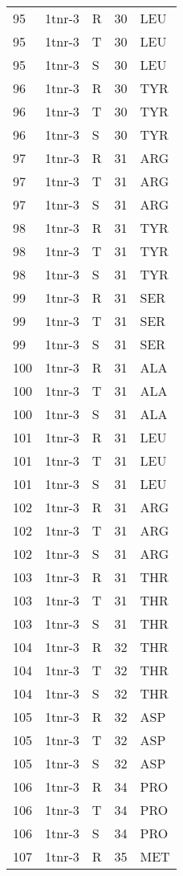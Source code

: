 \begin{tiny}
\begin{longtable}[l]{l|l|l|l|l}
	95 & 1tnr-3 & R & 30 & LEU \\
	95 & 1tnr-3 & T & 30 & LEU \\
	95 & 1tnr-3 & S & 30 & LEU \\
	96 & 1tnr-3 & R & 30 & TYR \\
	96 & 1tnr-3 & T & 30 & TYR \\
	96 & 1tnr-3 & S & 30 & TYR \\
	97 & 1tnr-3 & R & 31 & ARG \\
	97 & 1tnr-3 & T & 31 & ARG \\
	97 & 1tnr-3 & S & 31 & ARG \\
	98 & 1tnr-3 & R & 31 & TYR \\
	98 & 1tnr-3 & T & 31 & TYR \\
	98 & 1tnr-3 & S & 31 & TYR \\
	99 & 1tnr-3 & R & 31 & SER \\
	99 & 1tnr-3 & T & 31 & SER \\
	99 & 1tnr-3 & S & 31 & SER \\
	100 & 1tnr-3 & R & 31 & ALA \\
	100 & 1tnr-3 & T & 31 & ALA \\
	100 & 1tnr-3 & S & 31 & ALA \\
	101 & 1tnr-3 & R & 31 & LEU \\
	101 & 1tnr-3 & T & 31 & LEU \\
	101 & 1tnr-3 & S & 31 & LEU \\
	102 & 1tnr-3 & R & 31 & ARG \\
	102 & 1tnr-3 & T & 31 & ARG \\
	102 & 1tnr-3 & S & 31 & ARG \\
	103 & 1tnr-3 & R & 31 & THR \\
	103 & 1tnr-3 & T & 31 & THR \\
	103 & 1tnr-3 & S & 31 & THR \\
	104 & 1tnr-3 & R & 32 & THR \\
	104 & 1tnr-3 & T & 32 & THR \\
	104 & 1tnr-3 & S & 32 & THR \\
	105 & 1tnr-3 & R & 32 & ASP \\
	105 & 1tnr-3 & T & 32 & ASP \\
	105 & 1tnr-3 & S & 32 & ASP \\
	106 & 1tnr-3 & R & 34 & PRO \\
	106 & 1tnr-3 & T & 34 & PRO \\
	106 & 1tnr-3 & S & 34 & PRO \\
	107 & 1tnr-3 & R & 35 & MET \\

\end{longtable}
\end{tiny}
